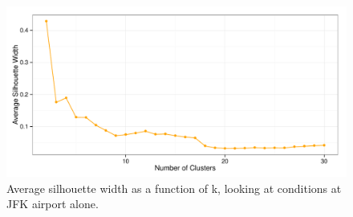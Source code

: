 \documentclass[11pt]{scrartcl}
\begin{document}
\begin{figure}[h]
\begin{center}
\includegraphics[scale=0.8125]{./figures/Fig6.pdf}
\caption{Average silhouette width as a function of k, looking at conditions at JFK airport alone.}
\label{default}
\end{center}
\end{figure}
\end{document}
